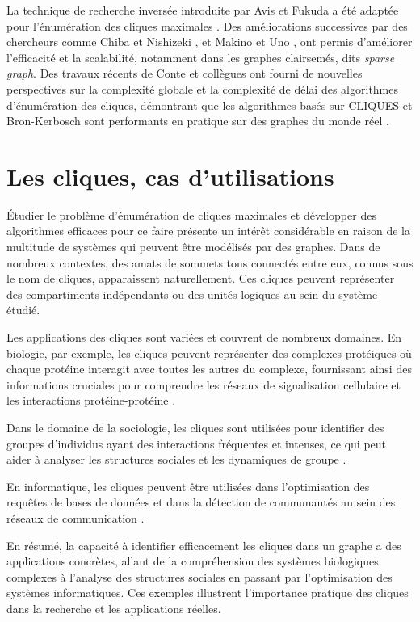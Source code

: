 \documentclass[12pt,a4paper]{article}
\begin{document}
La technique de recherche inversée introduite par Avis et Fukuda a été adaptée pour l'énumération des cliques maximales \cite{avis1996reverse}. Des améliorations successives par des chercheurs comme Chiba et Nishizeki \cite{chiba1985arboricity}, et Makino et Uno \cite{makino2004new}, ont permis d'améliorer l'efficacité et la scalabilité, notamment dans les graphes clairsemés, dits \emph{sparse graph}. Des travaux récents de Conte et collègues ont fourni de nouvelles perspectives sur la complexité globale et la complexité de délai des algorithmes d'énumération des cliques, démontrant que les algorithmes basés sur CLIQUES et Bron-Kerbosch sont performants en pratique sur des graphes du monde réel \cite{conte2022overall}.

\section{Les cliques, cas d'utilisations}%
\label{sec:usecase}

Étudier le problème d'énumération de cliques maximales et développer des algorithmes efficaces pour ce faire présente un intérêt considérable en raison de la multitude de systèmes qui peuvent être modélisés par des graphes. Dans de nombreux contextes, des amats de sommets tous connectés entre eux, connus sous le nom de cliques, apparaissent naturellement. Ces cliques peuvent représenter des compartiments indépendants ou des unités logiques au sein du système étudié.

Les applications des cliques sont variées et couvrent de nombreux domaines. En biologie, par exemple, les cliques peuvent représenter des complexes protéiques où chaque protéine interagit avec toutes les autres du complexe, fournissant ainsi des informations cruciales pour comprendre les réseaux de signalisation cellulaire et les interactions protéine-protéine \cite{PAVLOU2016305}.

Dans le domaine de la sociologie, les cliques sont utilisées pour identifier des groupes d'individus ayant des interactions fréquentes et intenses, ce qui peut aider à analyser les structures sociales et les dynamiques de groupe \cite{SCOTT201129}.

En informatique, les cliques peuvent être utilisées dans l'optimisation des requêtes de bases de données et dans la détection de communautés au sein des réseaux de communication \cite{CORMEN200932}.

En résumé, la capacité à identifier efficacement les cliques dans un graphe a des applications concrètes, allant de la compréhension des systèmes biologiques complexes à l'analyse des structures sociales en passant par l'optimisation des systèmes informatiques. Ces exemples illustrent l'importance pratique des cliques dans la recherche et les applications réelles\cite{FORTUNATO201075}.
\end{document}
